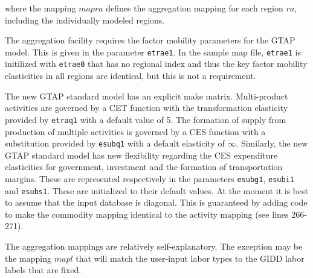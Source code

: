 \noindent where the mapping $\mathit{mapra}$ defines the aggregation mapping for
each region $\mathit{ra}$, including the individually modeled regions.

The aggregation facility requires the factor mobility parameters for the GTAP
model. This is given in the parameter \texttt{etrae1}. In the sample map file,
\texttt{etrae1} is initilized with \texttt{etrae0} that has no regional index
and thus the key factor mobility elasticities in all regions are identical, but
this is not a requirement.

The new GTAP standard model has an explicit make matrix. Multi-product
activities are governed by a CET function with the transformation elasticity
provided by \texttt{etraq1} with a default value of 5. The formation of supply
from production of multiple activities is governed by a CES function with a
substitution provided by \texttt{esubq1} with a default elasticity of $\infty$.
Similarly, the new GTAP standard model has new flexibility regarding the CES
expenditure elasticities for government, investment and the formation of
transportation margins. These are represented respectively in the parameters
\texttt{esubg1}, \texttt{esubi1} and \texttt{esubs1}. These are initialized to
their default values. At the moment it is best to assume that the input
database is diagonal. This is guaranteed by adding code to make
the commodity mapping identical to the activity mapping (see lines 266-271).

The aggregation mappings are relatively self-explanatory. The exception may be
the mapping $\mathit{mapl}$ that will match the user-input labor types to the
GIDD labor labels that are fixed.

